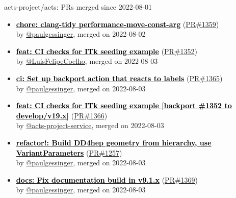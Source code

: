 \documentclass{beamer}
\begin{document}
\begin{frame}[allowframebreaks]{ acts-project/acts: PRs merged since 2022-08-01 }
\begin{itemize}
    \item
    \textbf{\href{https://github.com/acts-project/acts/pull/1359}{\textcolor{black}{chore: clang-tidy performance-move-const-arg}}}
    (\href{https://github.com/acts-project/acts/pull/1359}{PR\#1359}) \\
    by \href{https://github.com/paulgessinger}{ @paulgessinger}, merged on 2022-08-02

    \item
    \textbf{\href{https://github.com/acts-project/acts/pull/1352}{\textcolor{black}{feat: CI checks for ITk seeding example}}}
    (\href{https://github.com/acts-project/acts/pull/1352}{PR\#1352}) \\
    by \href{https://github.com/LuisFelipeCoelho}{ @LuisFelipeCoelho}, merged on 2022-08-03

    \item
    \textbf{\href{https://github.com/acts-project/acts/pull/1365}{\textcolor{black}{ci: Set up backport action that reacts to labels}}}
    (\href{https://github.com/acts-project/acts/pull/1365}{PR\#1365}) \\
    by \href{https://github.com/paulgessinger}{ @paulgessinger}, merged on 2022-08-03

    \item
    \textbf{\href{https://github.com/acts-project/acts/pull/1366}{\textcolor{black}{feat: CI checks for ITk seeding example [backport \#1352 to develop/v19.x]}}}
    (\href{https://github.com/acts-project/acts/pull/1366}{PR\#1366}) \\
    by \href{https://github.com/acts-project-service}{ @acts-project-service}, merged on 2022-08-03

    \item
    \textbf{\href{https://github.com/acts-project/acts/pull/1257}{\textcolor{black}{refactor!: Build DD4hep geometry from hierarchy, use VariantParameters}}}
    (\href{https://github.com/acts-project/acts/pull/1257}{PR\#1257}) \\
    by \href{https://github.com/paulgessinger}{ @paulgessinger}, merged on 2022-08-03

    \item
    \textbf{\href{https://github.com/acts-project/acts/pull/1369}{\textcolor{black}{docs: Fix documentation build in v9.1.x}}}
    (\href{https://github.com/acts-project/acts/pull/1369}{PR\#1369}) \\
    by \href{https://github.com/paulgessinger}{ @paulgessinger}, merged on 2022-08-03


\end{itemize}
\end{frame}
\end{document}
